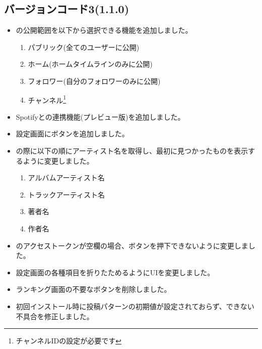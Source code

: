 \subsection*{バージョンコード3(1.1.0)}
\new
\begin{itemize}
    \item \nowplaying の公開範囲を以下から選択できる機能を追加しました。
        \begin{enumerate}
            \item パブリック(全てのユーザーに公開)
            \item ホーム(ホームタイムラインのみに公開)
            \item フォロワー(自分のフォロワーのみに公開)
            \item チャンネル\footnote{チャンネルIDの設定が必要です}
        \end{enumerate}
    \item Spotifyとの連携機能(プレビュー版)を追加しました。
    \item 設定画面にボタンを追加しました。
\end{itemize}

\change
\begin{itemize}
    \item \nowplaying の際に以下の順にアーティスト名を取得し、最初に見つかったものを表示するように変更しました。
        \begin{enumerate}
            \item アルバムアーティスト名
            \item トラックアーティスト名
            \item 著者名
            \item 作者名
        \end{enumerate}
    \item \mi のアクセストークンが空欄の場合、ボタンを押下できないように変更しました。
    \item 設定画面の各種項目を折りたためるようにUIを変更しました。
\end{itemize}

\fix
\begin{itemize}
    \item ランキング画面の不要なボタンを削除しました。
    \item 初回インストール時に投稿パターンの初期値が設定されておらず、\nowplaying できない不具合を修正しました。
\end{itemize}